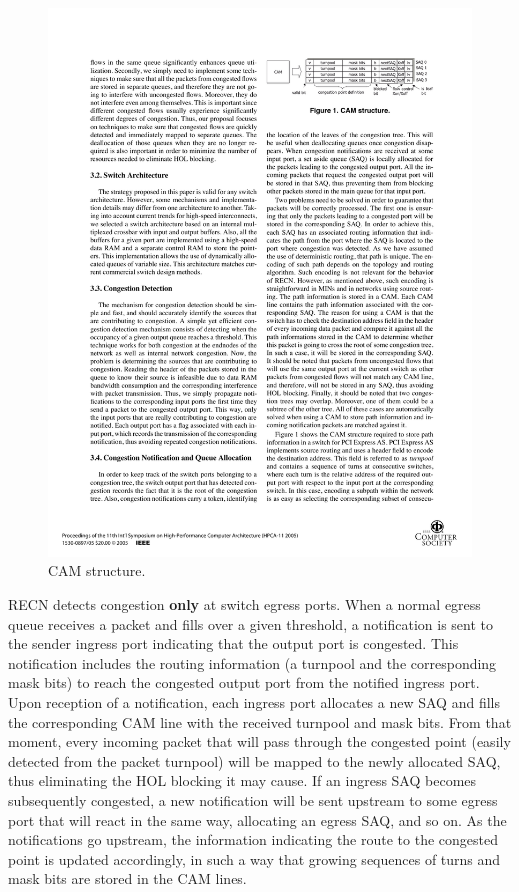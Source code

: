 \documentclass[12pt]{article}
\begin{document}
\begin{figure}[ht]
	\centering
		\includegraphics[scale=1.2]{figures/cam.pdf}
		\caption{CAM structure.}
		\label{fig:cam}
\end{figure}

RECN detects congestion \textbf{only} at switch egress ports. When a normal egress queue receives a packet and fills over a given threshold, a notification is sent to the sender ingress port indicating that the output port is congested. This notification includes the routing information (a turnpool and the corresponding mask bits) to reach the congested output port from the notified ingress port. Upon reception of a notification, each ingress port allocates a new SAQ and fills the corresponding CAM line with the received turnpool and mask bits. From that moment, every incoming packet that will pass through the congested point (easily detected from the packet turnpool) will be mapped to the newly allocated SAQ, thus eliminating the HOL blocking it may cause. If an ingress SAQ becomes subsequently congested, a new notification will be sent upstream to some egress port that will react in the same way, allocating an egress SAQ, and so on. As the notifications go upstream, the information indicating the route to the congested point is updated accordingly, in such a way that growing sequences of turns and mask bits are stored in the CAM lines. 
\end{document}
